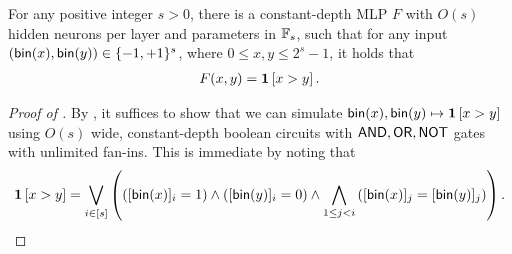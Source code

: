 \begin{lemma}\label{lem:mlp_comparison}
    For any positive integer $s>0$, there is a constant-depth MLP $F$ with $O(s)$ hidden neurons per layer and parameters in $\mathbb{F}_s$, such that for any input $(\mathsf{bin}(x),\mathsf{bin}(y))\in\{-1,+1\}^s$, where $0\le x,y\le 2^s-1$, it holds that  
    \begin{align*}
        F(x,y) = \bm{1}\left[x > y\right].
    \end{align*}
\end{lemma}

\begin{proof}[Proof of ]
    By , it suffices to show that we can simulate $\mathsf{bin}(x),\mathsf{bin}(y)\mapsto \bm{1}\left[x> y\right]$ using $O(s)$ wide, constant-depth boolean circuits with $\mathsf{AND},\mathsf{OR},\mathsf{NOT}$ gates with unlimited fan-ins. This is immediate by noting that 
    \begin{align}
\bm{1}\left[x > y\right] = \bigvee\limits_{i\in[s]} \left( ([\mathsf{bin}(x)]_i = 1) \wedge ([\mathsf{bin}(y)]_i = 0) \wedge \bigwedge\limits_{1\le j< i} \left([\mathsf{bin}(x)]_j = [\mathsf{bin}(y)]_j\right) \right).
    \end{align}
\end{proof}
